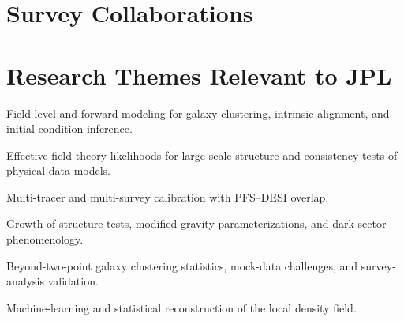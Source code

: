 \section*{Survey Collaborations}

\section*{Research Themes Relevant to JPL}
\begin{tightitemize}
  \item Field-level and forward modeling for galaxy clustering, intrinsic alignment, and initial-condition inference.
  \item Effective-field-theory likelihoods for large-scale structure and consistency tests of physical data models.
  \item Multi-tracer and multi-survey calibration with PFS--DESI overlap.
  \item Growth-of-structure tests, modified-gravity parameterizations, and dark-sector phenomenology.
  \item Beyond-two-point galaxy clustering statistics, mock-data challenges, and survey-analysis validation.
  \item Machine-learning and statistical reconstruction of the local density field.
\end{tightitemize}

